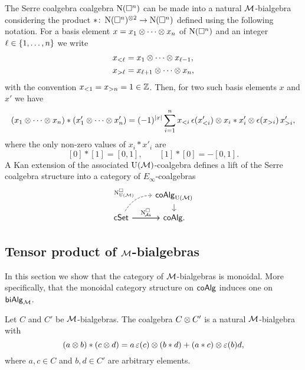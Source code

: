\begin{example}\label{ex:cubical e-infty}
	The Serre coalgebra coalgebra $\operatorname{N}(\square^n)$ can be made into a natural $\mathcal{M}$-bialgebra considering the product $\ast \colon \operatorname{N}(\square^n)^{\otimes 2} \to \operatorname{N}(\square^n)$ defined using the following notation.
	For a basis element $x = x_1 \otimes \dotsb \otimes x_n$ of $\operatorname{N}(\square^n)$ and an integer $\ell \in \{1,\dots,n\}$ we write
	\begin{align*}
		x_{<\ell} & = x_1 \otimes \dotsb \otimes x_{\ell-1}, \\
		x_{>\ell} & = x_{\ell+1} \otimes \dotsb \otimes x_n,
	\end{align*}
	with the convention $x_{<1} = x_{>n} = 1 \in \mathbb{Z}$.
	Then, for two such basis elements $x$ and $x'$ we have
	\begin{multline*}
		(x_1 \otimes \dotsb \otimes x_n) \ast (x'_1 \otimes \dotsb \otimes x'_n)
		=
		(-1)^{|x|} \sum_{i=1}^n x_{<i}\, \epsilon(x'_{<i}) \otimes x_i \ast x'_i \otimes \epsilon(x_{>i}) \, x'_{>i},
	\end{multline*}
	where the only non-zero values of $x_i \ast x'_i$ are
	\[
	[0] \ast [1] = [0, 1], \qquad [1] \ast [0] = -[0, 1].
	\]
	A Kan extension of the associated ${\operatorname{U}(\mathcal{M})}$-coalgebra defines a lift of the Serre coalgebra structure into a category of $E_\infty$-coalgebras
	\begin{equation}\label{eq:lift to e-infty cubical}
		\begin{tikzcd}[column sep=normal, row sep=small]
			& \coAlg_{\UM} \arrow[d] \\
			\cSet \arrow[r]
			\arrow[ur,out=60, in=180, dashed, "\cchainsUM"]
			\arrow[r, "\cchainsA"]
			& \coAlg.
		\end{tikzcd}
	\end{equation}
\end{example}

\subsection{Tensor product of $\mathcal{M}$-bialgebras}

In this section we show that the category of $\mathcal{M}$-bialgebras is monoidal.
More specifically, that the monoidal category structure on $\mathsf{coAlg}$ induces one on $\mathsf{biAlg}_{\mathcal{M}}$.

\begin{lemma}\label{l:monoidal M-bialg}
	Let $C$ and $C'$ be $\mathcal{M}$-bialgebras.
	The coalgebra $C \otimes C'$ is a natural $\mathcal{M}$-bialgebra with
	\begin{equation}\label{eq:monoidal_product}
		(a \otimes b) \ast (c \otimes d) =
		a \operatorname{\varepsilon}(c) \otimes (b \ast d) + (a \ast c) \otimes \operatorname{\varepsilon}(b) d,
	\end{equation}
	where $a,c \in C$ and $b,d \in C'$ are arbitrary elements.
\end{lemma}

